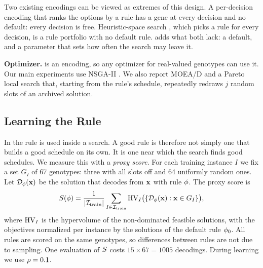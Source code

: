 Two existing encodings can be viewed as extremes of this design.
A per-decision encoding that ranks the options by a rule has a gene at every decision and no default: every decision is free.
Heuristic-space search \cite{storer1992new,dorndorf1995evolution}, which picks a rule for every decision, is a rule portfolio with no default rule.
\RDD adds what both lack: a default, and a parameter that sets how often the search may leave it.

\textbf{Optimizer.}
\RDD is an encoding, so any optimizer for real-valued genotypes can use it.
Our main experiments use NSGA-II \cite{deb2002nsga2}.
We also report MOEA/D \cite{zhang2007moead} and a Pareto local search that, starting from the rule's schedule, repeatedly redraws $j$ random slots of an archived solution.

\subsection{Learning the Rule}
\label{sec:method:learn}

In \RDD the rule is used inside a search.
A good rule is therefore not simply one that builds a good schedule on its own.
It is one near which the search finds good schedules.
We measure this with a \emph{proxy score}.
For each training instance $I$ we fix a set $G_I$ of 67 genotypes: three with all slots off and 64 uniformly random ones.
Let $\mathcal{D}_\phi(\mathbf{x})$ be the solution that \RDD decodes from $\mathbf{x}$ with rule $\phi$. The proxy score is
\begin{equation}
  S(\phi) = \frac{1}{|\mathcal{I}_{\text{train}}|} \sum_{I \in \mathcal{I}_{\text{train}}} \mathrm{HV}_I\bigl(\{\mathcal{D}_\phi(\mathbf{x}) : \mathbf{x} \in G_I\}\bigr),
\end{equation}
where $\mathrm{HV}_I$ is the hypervolume of the non-dominated feasible solutions, with the objectives normalized per instance by the solutions of the default rule $\phi_0$.
All rules are scored on the same genotypes, so differences between rules are not due to sampling.
One evaluation of $S$ costs $15 \times 67 = 1005$ decodings.
During learning we use $\rho = 0.1$.

